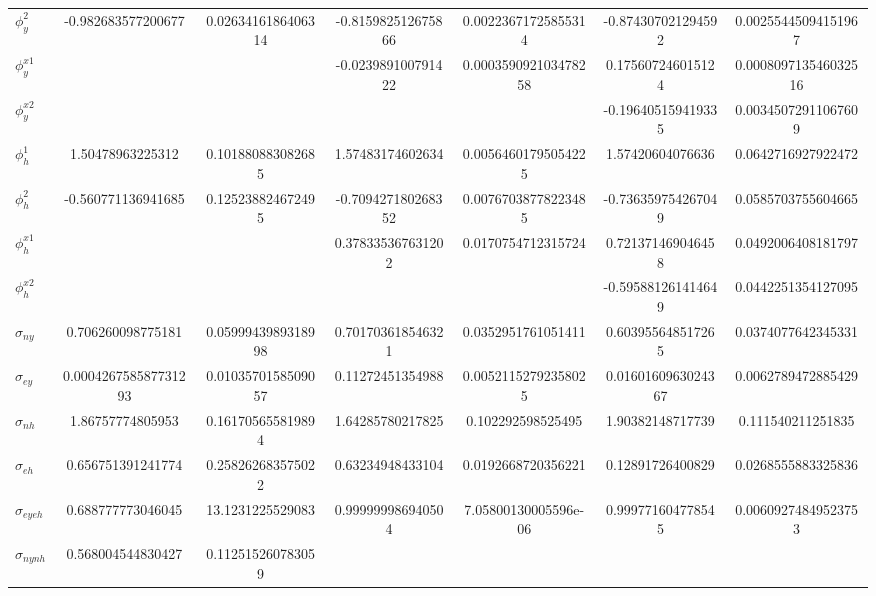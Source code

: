 \documentclass[12pt]{article}
\begin{document}
\begin{outline}[enumerate]
\begin{landscape}
\begin{table}[]
\begin{threeparttable}
\begin{tabular}{@{}lSSSSSS@{}}
$\phi^2_{y}$ & -0.982683577200677 & 0.0263416186406314 & -0.815982512675866 & 0.00223671725855314 & -0.874307021294592 & 0.00255445094151967 \\[2pt] 

$\phi^{x1}_{y}$ &  &  & -0.023989100791422 & 0.000359092103478258 & 0.175607246015124 & 0.000809713546032516 \\[2pt] 

$\phi^{x2}_{y}$ &  &  &  &  & -0.196405159419335 & 0.00345072911067609 \\[2pt] 

$\phi^1_{h}$ & 1.50478963225312 & 0.101880883082685 & 1.57483174602634 & 0.00564601795054225 & 1.57420604076636 & 0.0642716927922472 \\[2pt] 

$\phi^2_{h}$ & -0.560771136941685 & 0.125238824672495 & -0.709427180268352 & 0.00767038778223485 & -0.736359754267049 & 0.0585703755604665 \\[2pt] 

$\phi^{x1}_{h}$ &  &  & 0.378335367631202 & 0.0170754712315724 & 0.721371469046458 & 0.0492006408181797 \\[2pt] 

$\phi^{x2}_{h}$ &  &  &  &  & -0.595881261414649 & 0.0442251354127095 \\[2pt] 

$\sigma_{ny}$ & 0.706260098775181 & 0.0599943989318998 & 0.701703618546321 & 0.0352951761051411 & 0.603955648517265 & 0.0374077642345331 \\[2pt] 

$\sigma_{ey}$ & 0.000426758587731293 & 0.0103570158509057 & 0.11272451354988 & 0.00521152792358025 & 0.0160160963024367 & 0.0062789472885429 \\[2pt] 

$\sigma_{nh}$ & 1.86757774805953 & 0.161705655819894 & 1.64285780217825 & 0.102292598525495 & 1.90382148717739 & 0.111540211251835 \\[2pt] 

$\sigma_{eh}$ & 0.656751391241774 & 0.258262683575022 & 0.63234948433104 & 0.0192668720356221 & 0.12891726400829 & 0.0268555883325836 \\[2pt] 

$\sigma_{eyeh}$ & 0.688777773046045 & 13.1231225529083 & 0.999999986940504 & 7.05800130005596e-06 & 0.999771604778545 & 0.00609274849523753 \\[2pt] 

$\sigma_{nynh}$ & 0.568004544830427 & 0.112515260783059 &  &  &  &  \\[2pt] 


\end{tabular}
\end{threeparttable}
\end{table}
\end{landscape}
\end{outline}
\end{document}

